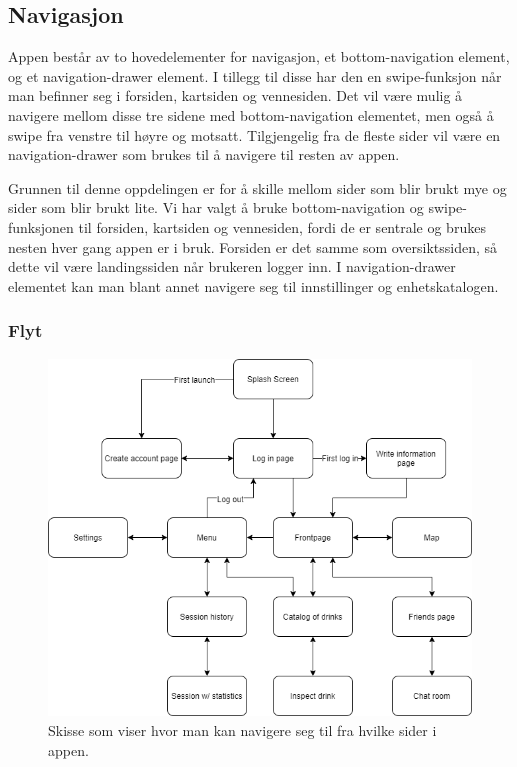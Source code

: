 \subsection{Navigasjon}
Appen består av to hovedelementer for navigasjon, et bottom-navigation element, og et navigation-drawer element. I tillegg til disse har den en swipe-funksjon når man befinner seg i forsiden, kartsiden og vennesiden. Det vil være mulig å navigere mellom disse tre sidene med bottom-navigation elementet, men også å swipe fra venstre til høyre og motsatt. Tilgjengelig fra de fleste sider vil være en navigation-drawer som brukes til å navigere til resten av appen.

Grunnen til denne oppdelingen er for å skille mellom sider som blir brukt mye og sider som blir brukt lite. Vi har valgt å bruke bottom-navigation og swipe-funksjonen til forsiden, kartsiden og vennesiden, fordi de er sentrale og brukes nesten hver gang appen er i bruk. Forsiden er det samme som oversiktssiden, så dette vil være landingssiden når brukeren logger inn. I navigation-drawer elementet kan man blant annet navigere seg til innstillinger og enhetskatalogen.

\subsubsection{Flyt}

\begin{figure}[H]
    \centering
    \includegraphics[scale=0.5]{images/lille_promille_float_diagram.drawio.png}
    \caption{Skisse som viser hvor man kan navigere seg til fra hvilke sider i appen.}
\end{figure}

